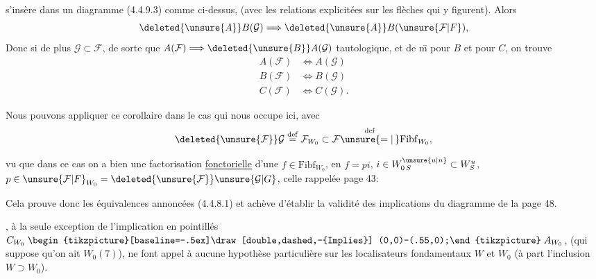 
s'insère dans un diagramme  (4.4.9.3) comme ci-dessus, (avec les relations explicitées sur les flèches qui y figurent). Alors
\[
 \deleted{\unsure{A}}B(\mathcal{G})\Longrightarrow \deleted{\unsure{A}}B(\unsure{\mathcal{F}|F}),
\]
Donc si de plus $\mathcal{G}\subset\mathcal{F}$,  de sorte que $A(\mathcal{F})\Longrightarrow \deleted{\unsure{B}}A(\mathcal{G})$  tautologique, et de \={m} pour $B$ et pour $C$, on trouve
\[
 \begin{aligned}
 A(\mathcal{F})&\Longleftrightarrow A(\mathcal{G})\\
 B(\mathcal{F})&\Longleftrightarrow B(\mathcal{G})\\
 C(\mathcal{F})&\Longleftrightarrow C(\mathcal{G}).
 \end{aligned}
\]

Nous pouvons appliquer ce corollaire dans le cas qui nous occupe ici, avec
\[
 \deleted{\unsure{\mathcal{F}}}\mathcal{G}\overset{\mathrm{def}}{=}\mathcal{F}_{W_0}
 \subset\mathcal{F}\overset{\mathrm{def}}{\unsure{=|\,}}\mathrm{Fibf}_{W_0},
\]

vu que dans ce cas on a bien une factorisation \uline{fonctorielle} d'une $f\in\mathrm{Fibf}_{W_0}$,  en $f=pi$, $i\in W_{0\,S}^{\unsure{u|n}}\subset W_S^u$, $p\in\unsure{\mathcal{F}|F}_{W_0}=\deleted{\unsure{\mathcal{F}}}\unsure{\mathcal{G}|G}$,  celle rappelée page 43:


Cela prouve donc les équivalences annoncées (4.4.8.1) et achève d'établir la validité des implications du diagramme de la page 48.

  , à la seule exception de l'implication en pointillés $C_{W_0}\mathrel{\begin{tikzpicture}[baseline=-.5ex]\draw[double,dashed,-{Implies}] (0,0)--(.55,0);\end{tikzpicture}}A_{W_0}$,  (qui suppose qu'on ait $W_0(7)$), ne font appel à aucune hypothèse particulière sur les localisateurs fondamentaux $W$ et $W_0$ (à part l'inclusion $W\supset W_0$).

